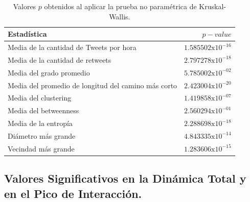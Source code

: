 \documentclass[../main.tex]{subfiles}
\begin{document}
\begin{table}[h!]
    \centering
    \caption{Valores $p$ obtenidos al aplicar la prueba no paramétrica de Kruskal-Wallis. }
    \begin{tabular}{lr}
\toprule
      Estadística  &       \textit{$p-value$} \\
\midrule
     Media de la cantidad de Tweets por hora  &  $1.585502\text{x}10^{-16}$ \\
   Media de la cantidad de retweets &  $2.797278\text{x}10^{-18} $\\
    Media del grado promedio &  $5.785002\text{x}10^{-02}$ \\
    Media del promedio de longitud del camino más corto   &  $2.423004\text{x}10^{-20}$ \\
  Media del clustering &  $1.419858\text{x}10^{-07}$ \\
 Media del betweenness &  $2.560294\text{x}10^{-01}$ \\
     Media de la entropía &  $2.288698\text{x} 10^{-18}$ \\
     Diámetro más grande &  $4.843335\text{x} 10^{-14}$ \\
        Vecindad más grande &  $1.283606\text{x} 10^{-15}$ \\
\bottomrule
\end{tabular}
    \label{tab:resultados_diferenciasDeTendencias}
\end{table}


\subsection{ Valores Significativos en la Dinámica Total y en el Pico de Interacción.  }


 

\end{document}
